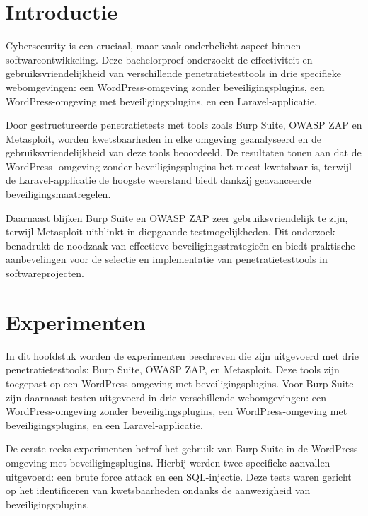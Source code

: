 \documentclass[a0,portrait]{hogent-poster}
\begin{document}
\begin{multicols}{2} %

\section{Introductie}

Cybersecurity is een cruciaal, maar vaak onderbelicht aspect binnen softwareontwikkeling. Deze bachelorproef onderzoekt 
de effectiviteit en gebruiksvriendelijkheid van verschillende penetratietesttools in drie specifieke webomgevingen: een 
WordPress-omgeving zonder beveiligingsplugins, een WordPress-omgeving met beveiligingsplugins, en een Laravel-applicatie.

Door gestructureerde penetratietests met tools zoals Burp Suite, OWASP ZAP en Metasploit, worden kwetsbaarheden in elke 
omgeving geanalyseerd en de gebruiksvriendelijkheid van deze tools beoordeeld. De resultaten tonen aan dat de WordPress-
omgeving zonder beveiligingsplugins het meest kwetsbaar is, terwijl de Laravel-applicatie de hoogste weerstand biedt 
dankzij geavanceerde beveiligingsmaatregelen.

Daarnaast blijken Burp Suite en OWASP ZAP zeer gebruiksvriendelijk te zijn, terwijl Metasploit uitblinkt in diepgaande 
testmogelijkheden. Dit onderzoek benadrukt de noodzaak van effectieve beveiligingsstrategieën en biedt praktische 
aanbevelingen voor de selectie en implementatie van penetratietesttools in softwareprojecten.

\section{Experimenten}

In dit hoofdstuk worden de experimenten beschreven die zijn uitgevoerd met drie penetratietesttools: Burp Suite, OWASP 
ZAP, en Metasploit. Deze tools zijn toegepast op een WordPress-omgeving met beveiligingsplugins. Voor Burp Suite zijn 
daarnaast testen uitgevoerd in drie verschillende webomgevingen: een WordPress-omgeving zonder beveiligingsplugins, 
een WordPress-omgeving met beveiligingsplugins, en een Laravel-applicatie.

De eerste reeks experimenten betrof het gebruik van Burp Suite in de WordPress-omgeving met beveiligingsplugins. 
Hierbij werden twee specifieke aanvallen uitgevoerd: een brute force attack en een SQL-injectie. Deze tests waren 
gericht op het identificeren van kwetsbaarheden ondanks de aanwezigheid van beveiligingsplugins.


\end{multicols}
\end{document}
